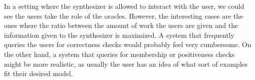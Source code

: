 In a setting where the synthesizer is allowed to interact with the user, we
could see the users take the role of the oracles.
However, the interesting cases are the ones where the ratio between the amount
of work the users are given and the information given to the synthesizer is
maximized.
A system that frequently queries the users for correctness checks would probably
feel very cumbersome.
On the other hand, a system that queries for membership or positiveness checks
might be more realistic, as usually the user has an idea of what sort of
examples fit their desired model.

